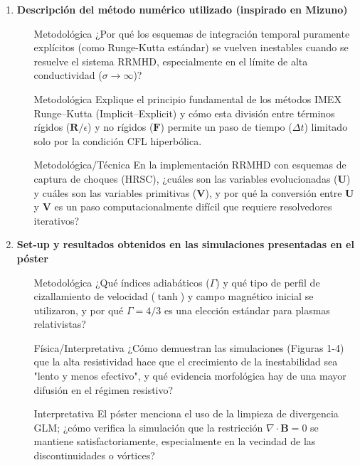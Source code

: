 \begin{enumerate}
    \item \textbf{Descripción del método numérico utilizado (inspirado en Mizuno)}
    \begin{itemize}
        \item [Metodológica] ¿Por qué los esquemas de integración temporal puramente explícitos (como Runge-Kutta estándar) se vuelven inestables cuando se resuelve el sistema RRMHD, especialmente en el límite de alta conductividad ($\sigma \to \infty$)? \cite{356, 357, 331}
        \item [Metodológica] Explique el principio fundamental de los métodos IMEX Runge–Kutta (Implicit–Explicit) y cómo esta división entre términos rígidos ($\mathbf{R}/\epsilon$) y no rígidos ($\mathbf{F}$) permite un paso de tiempo ($\Delta t$) limitado solo por la condición CFL hiperbólica. \cite{356, 359}
        \item [Metodológica/Técnica] En la implementación RRMHD con esquemas de captura de choques (HRSC), ¿cuáles son las variables evolucionadas ($\mathbf{U}$) y cuáles son las variables primitivas ($\mathbf{V}$), y por qué la conversión entre $\mathbf{U}$ y $\mathbf{V}$ es un paso computacionalmente difícil que requiere resolvedores iterativos? \cite{360, 370, 363}
    \end{itemize}

    \item \textbf{Set-up y resultados obtenidos en las simulaciones presentadas en el póster}
    \begin{itemize}
        \item [Metodológica] ¿Qué índices adiabáticos ($\Gamma$) y qué tipo de perfil de cizallamiento de velocidad ($\tanh$) y campo magnético inicial se utilizaron, y por qué $\Gamma=4/3$ es una elección estándar para plasmas relativistas? \cite{381, 361}
        \item [Física/Interpretativa] ¿Cómo demuestran las simulaciones (Figuras 1-4) que la alta resistividad hace que el crecimiento de la inestabilidad sea "lento y menos efectivo", y qué evidencia morfológica hay de una mayor difusión en el régimen resistivo? \cite{380, 382, 364}
        \item [Interpretativa] El póster menciona el uso de la limpieza de divergencia GLM; ¿cómo verifica la simulación que la restricción $\nabla \cdot \mathbf{B}=0$ se mantiene satisfactoriamente, especialmente en la vecindad de las discontinuidades o vórtices? \cite{389, 362}
    \end{itemize}


\end{enumerate}
